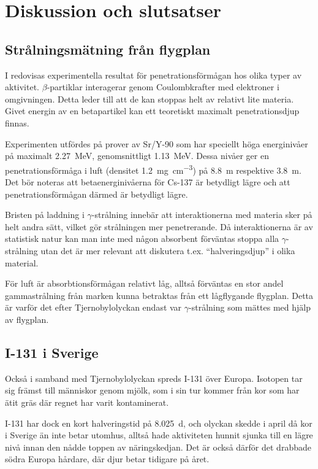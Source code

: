 \section{Diskussion och slutsatser}

\subsection{Strålningsmätning från flygplan}

I \cite{penetration} redovisas experimentella resultat för penetrationsförmågan
hos olika typer av aktivitet. $\beta$-partiklar interagerar genom
Coulombkrafter med elektroner i omgivningen. Detta leder till att de kan
stoppas helt av relativt lite materia. Givet energin av en betapartikel kan
ett teoretiskt maximalt penetrationsdjup finnas.

Experimenten utfördes på prover av Sr/Y-90 som har speciellt höga energinivåer
på maximalt \qty{2.27}{\MeV}, genomsnittligt \qty{1.13}{\MeV}. Dessa nivåer ger
en penetrationsförmåga i luft (densitet \qty{1.2}{\mg\per\cm\cubed}) på
\qty{8.8}{\m} respektive \qty{3.8}{\m}. Det bör noteras att betaenerginivåerna
för Cs-137 är betydligt lägre \parencite{fysika} och att penetrationsförmågan
därmed är betydligt lägre.

Bristen på laddning i $\gamma$-strålning innebär att interaktionerna med
materia sker på helt andra sätt, vilket gör strålningen mer penetrerande. Då
interaktionerna är av statistisk natur kan man inte med någon absorbent
förväntas stoppa alla $\gamma$-strålning utan det är mer relevant att diskutera
t.ex. ``halveringsdjup'' i olika material.

För luft är absorbtionsförmågan relativt låg, alltså förväntas en stor andel
gammastrålning från marken kunna betraktas från ett lågflygande flygplan. Detta
är varför det efter Tjernobylolyckan endast var $\gamma$-strålning som mättes
med hjälp av flygplan.

\subsection{I-131 i Sverige}

Också i samband med Tjernobylolyckan spreds I-131 över Europa. Isotopen tar sig
främst till människor genom mjölk, som i sin tur kommer från kor som har ätit
gräs där regnet har varit kontaminerat.

I-131 har dock en kort halveringstid på \qty{8.025}{\day}, och olyckan skedde
i april då kor i Sverige än inte betar utomhus, alltså hade aktiviteten hunnit
sjunka till en lägre nivå innan den nådde toppen av näringskedjan. Det är också
därför det drabbade södra Europa hårdare, där djur betar tidigare på året.
